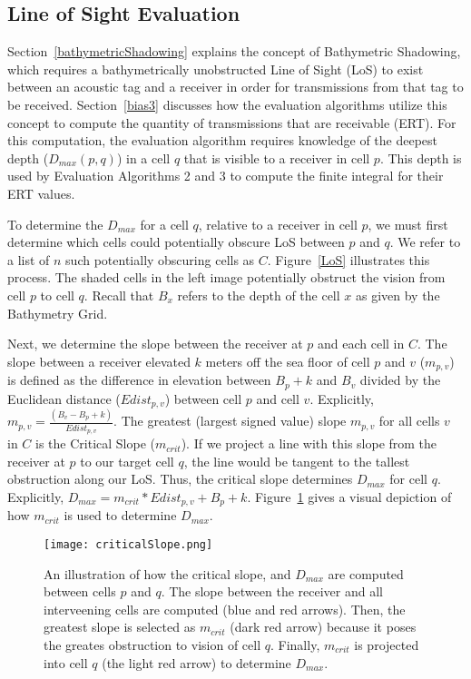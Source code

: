 \subsection {Line of Sight Evaluation}
\label{LoSAlgorithm}
Section~\ref{bathymetricShadowing} explains the concept of Bathymetric Shadowing, which requires a bathymetrically unobstructed Line of Sight (LoS) to exist between an acoustic tag and a receiver in order for transmissions from that tag to be received.  Section~\ref{bias3} discusses how the evaluation algorithms utilize this concept to compute the quantity of transmissions that are receivable (ERT).  For this computation, the evaluation algorithm requires knowledge of the deepest depth ($D_{max}(p,q)$) in a cell $q$ that is visible to a receiver in cell $p$.  This depth is used by Evaluation Algorithms 2 and 3 to compute the finite integral for their ERT values.

To determine the $D_{max}$ for a cell $q$, relative to a receiver in cell $p$, we must first determine which cells could potentially obscure LoS between $p$ and $q$.  We refer to a list of $n$ such potentially obscuring cells as $C$.   Figure~\ref{LoS} illustrates this process.  The shaded cells in the left image potentially obstruct the vision from cell $p$ to cell $q$.  Recall that $B_x$ refers to the depth of the cell $x$ as given by the Bathymetry Grid.

Next, we determine the slope between the receiver at $p$ and each cell in $C$.  The slope between a receiver elevated $k$ meters off the sea floor of cell $p$ and $v$  ($m_{p,v}$) is defined as the difference in elevation between $B_p + k$ and $B_v$ divided by the Euclidean distance ($Edist_{p,v}$) between cell $p$ and cell $v$.  Explicitly, $m_{p,v} = \frac{(B_v - B_p + k)}{Edist_{p,v}}$.  The greatest (largest signed value) slope $m_{p,v}$ for all cells $v$ in $C$ is the Critical Slope ($m_{crit}$).  If we project a line with this slope from the receiver at $p$ to our target cell $q$, the line would be tangent to the tallest obstruction along our LoS.  Thus, the critical slope determines $D_{max}$ for cell $q$.  Explicitly, $D_{max} = m_{crit} * Edist_{p,v} + B_p + k$.  Figure~\ref{LoSimage} gives a visual depiction of how $m_{crit}$ is used to determine $D_{max}$.

\begin{figure}[ht]
	\centering
	\texttt{[image: criticalSlope.png]}
	\caption{An illustration of how the critical slope, and $D_{max}$ are computed between cells $p$ and $q$.  The slope between the receiver and all interveening cells are computed (blue and red arrows).  Then, the greatest slope is selected as $m_{crit}$ (dark red arrow) because it poses the greates obstruction to vision of cell $q$.  Finally, $m_{crit}$ is projected into cell $q$ (the light red arrow) to determine $D_{max}$.
		\label{LoSimage}}
\end{figure}


